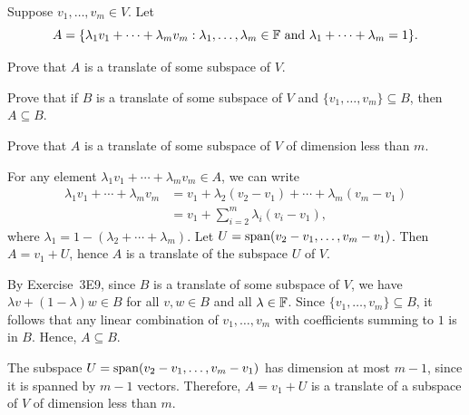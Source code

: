 \begin{exc}
\begin{exercise}
Suppose $v_1,\dots,v_m\in V$. Let
\[ A = \{\lambda_1v_1+\cdots+\lambda_mv_m : \lambda_1,\dots,\lambda_m\in\mathbb{F}
   \text{ and } \lambda_1+\cdots+\lambda_m=1\}. \]
\begin{parts}
\item Prove that $A$ is a translate of some subspace of $V$.
\item Prove that if $B$ is a translate of some subspace of $V$ and
  $\{v_1,\dots,v_m\}\subseteq B$, then $A\subseteq B$.
\item Prove that $A$ is a translate of some subspace of $V$ of dimension less
  than $m$.
\end{parts}
\end{exercise}
\begin{solution}\leavevmode
\begin{parts}
\item For any element $\lambda_1v_1+\cdots+\lambda_mv_m\in A$, we can write
  \begin{align*}
  \lambda_1v_1+\cdots+\lambda_mv_m
    &= v_1+\lambda_2(v_2-v_1)+\cdots+\lambda_m(v_m-v_1)\\
    &= v_1+\sum_{i=2}^m\lambda_i(v_i-v_1),
  \end{align*}
  where $\lambda_1=1-(\lambda_2+\cdots+\lambda_m)$. Let
  $U=\operatorname{span}(v_2-v_1,\dots,v_m-v_1)$. Then $A=v_1+U$, hence $A$ is a translate of
  the subspace $U$ of $V$.
\item By Exercise~3E9, since $B$ is a translate of some subspace of $V$, we have
  $\lambda v+(1-\lambda)w\in B$ for all $v,w\in B$ and all $\lambda\in\mathbb{F}$. Since
  $\{v_1,\dots,v_m\}\subseteq B$, it follows that any linear combination of
  $v_1,\dots,v_m$ with coefficients summing to $1$ is in $B$. Hence,
  $A\subseteq B$.
\item The subspace $U=\operatorname{span}(v_2-v_1,\dots,v_m-v_1)$ has dimension at most $m-1$,
  since it is spanned by $m-1$ vectors. Therefore, $A=v_1+U$ is a translate of a
  subspace of $V$ of dimension less than $m$. \qedhere
\end{parts}
\end{solution}


\end{exc}
